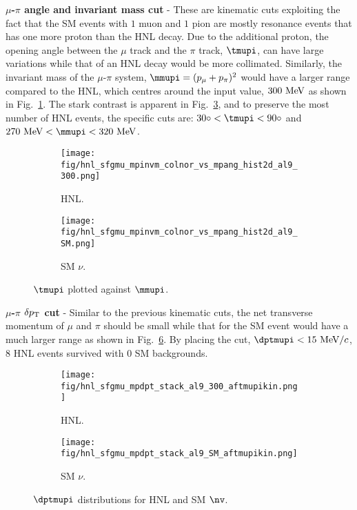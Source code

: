         \textbf{$\mu$-$\pi$ angle and invariant mass cut} - These are kinematic cuts exploiting the fact that the SM events with $1$ muon and $1$ pion are mostly resonance events that has one more proton than the HNL decay. 
        Due to the additional proton, the opening angle between the $\mu$ track and the $\pi$ track, $\tmupi$, can have large variations while that of an HNL decay would be more collimated. 
        Similarly, the invariant mass of the $\mu$-$\pi$ system, $\mmupi=(\pmu+\ppi)^2$ would have a larger range compared to the HNL, which centres around the input value, $300~\textrm{MeV}$ as shown in Fig.~\ref{fig:hnl-mmupi}.
        The stark contrast is apparent in Fig.~\ref{fig:mmupi-mupiang}, and to preserve the most number of HNL events, the specific cuts are: $30\degree<\tmupi<90\degree$ and $270~\mev<\mmupi<320~\mev$. 
        \begin{figure}[!htb]
           \centering
           \begin{subfigure}{0.45\textwidth}
                \texttt{[image: fig/hnl\_sfgmu\_mpinvm\_colnor\_vs\_mpang\_hist2d\_al9\_300.png]}
                \caption{HNL.}
                \label{fig:hnl-mmupi}
           \end{subfigure}
           \begin{subfigure}{0.45\textwidth}
                \texttt{[image: fig/hnl\_sfgmu\_mpinvm\_colnor\_vs\_mpang\_hist2d\_al9\_SM.png]}
                \caption{SM $\nu$.}
                \label{fig:sm-mmupi}
           \end{subfigure}
           \caption{$\tmupi$ plotted against $\mmupi$.}
           \label{fig:mmupi-mupiang}
        \end{figure}

        \textbf{$\mu$-$\pi$ $\delta p_\textrm{T}$ cut} - Similar to the previous kinematic cuts, the net transverse momentum of $\mu$ and $\pi$ should be small while that for the SM event would have a much larger range as shown in Fig.~\ref{fig:mmupi-dpt}. By placing the cut, $\dptmupi<15~\mevc$, $8$ HNL events survived with $0$ SM backgrounds.
        
        \begin{figure}[!htb]
           \centering
           \begin{subfigure}{0.45\textwidth}
                \texttt{[image: fig/hnl\_sfgmu\_mpdpt\_stack\_al9\_300\_aftmupikin.png]}
                \caption{HNL.}
                \label{fig:hnl-mupidpt}
           \end{subfigure}
           \begin{subfigure}{0.45\textwidth}
                \texttt{[image: fig/hnl\_sfgmu\_mpdpt\_stack\_al9\_SM\_aftmupikin.png]}
                \caption{SM $\nu$.}
                \label{fig:sm-mupidpt}
           \end{subfigure}
           \caption{$\dptmupi$ distributions for HNL and SM $\nv$.}
           \label{fig:mmupi-dpt}
        \end{figure}


